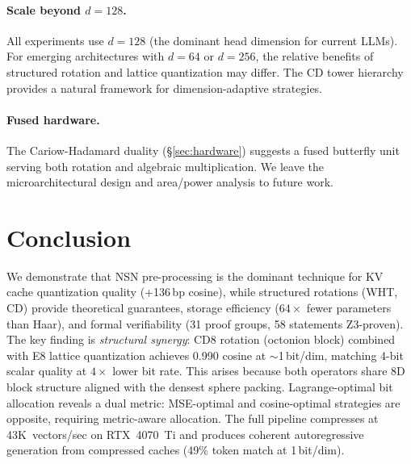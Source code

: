 \documentclass[sigconf,anonymous,review]{acmart}
\begin{document}
\paragraph{Scale beyond $d=128$.}
All experiments use $d=128$ (the dominant head dimension for
current LLMs). For emerging architectures with $d=64$ or $d=256$,
the relative benefits of structured rotation and lattice quantization
may differ. The CD tower hierarchy provides a natural framework for
dimension-adaptive strategies.

\paragraph{Fused hardware.}
The Cariow-Hadamard duality (\S\ref{sec:hardware}) suggests a
fused butterfly unit serving both rotation and algebraic multiplication.
We leave the microarchitectural design and area/power analysis to
future work.

\section{Conclusion}
\label{sec:conclusion}

We demonstrate that NSN pre-processing is the dominant technique for
KV cache quantization quality (+136\,bp cosine), while structured
rotations (WHT, CD) provide theoretical guarantees, storage efficiency
($64\times$ fewer parameters than Haar), and formal verifiability
(31 proof groups, 58 statements Z3-proven). The key finding is
\emph{structural synergy}: CD8 rotation (octonion block) combined
with E8 lattice quantization achieves 0.990 cosine at $\sim$1\,bit/dim,
matching 4-bit scalar quality at $4\times$ lower bit rate. This
arises because both operators share 8D block structure aligned with
the densest sphere packing. Lagrange-optimal bit allocation reveals
a dual metric: MSE-optimal and cosine-optimal strategies are opposite,
requiring metric-aware allocation. The full pipeline compresses at
43K~vectors/sec on RTX~4070~Ti and produces coherent autoregressive
generation from compressed caches (49\% token match at 1\,bit/dim).
\end{document}
